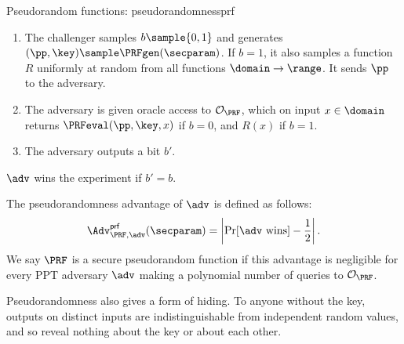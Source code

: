 \begin{experimentbox}{Pseudorandom functions: pseudorandomness}{prf}

  \begin{enumerate}

    \item The challenger samples $b \sample \{0,1\}$ and generates $(\pp, \key)
\sample \PRFgen(\secparam)$. If $b = 1$, it also samples a function $R$
uniformly at random from all functions $\domain \to \range$. It sends $\pp$ to
the adversary.

    \item The adversary is given oracle access to $\mathcal{O}_{\PRF}$, which on
input $x \in \domain$ returns $\PRFeval(\pp, \key, x)$ if $b = 0$, and $R(x)$ if
$b = 1$.

    \item The adversary outputs a bit $b'$.

  \end{enumerate}

  $\adv$ wins the experiment if $b' = b$.

\end{experimentbox}

The pseudorandomness advantage of $\adv$ is defined as follows:
%
\begin{equation*}
%
  \Adv_{\PRF,\adv}^{\mathsf{prf}}(\secparam) = \left| \Pr[\adv\text{
wins}]-\frac{1}{2} \right|.
%
\end{equation*}
%
We say $\PRF$ is a secure pseudorandom function if this advantage is negligible for
every PPT adversary $\adv$ making a polynomial number of queries to
$\mathcal{O}_{\PRF}$.

Pseudorandomness also gives a form of hiding. To anyone without the key, outputs
on distinct inputs are indistinguishable from independent random values, and so
reveal nothing about the key or about each other.
